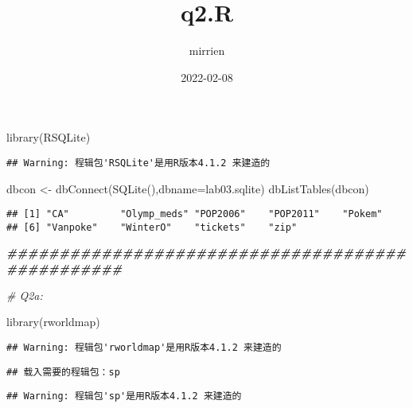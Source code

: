 \documentclass[
]{article}
\title{q2.R}
\author{mirrien}
\date{2022-02-08}
\newenvironment{Shaded}{\begin{snugshade}}{\end{snugshade}}
\newcommand{\AttributeTok}[1]{\textcolor[rgb]{0.77,0.63,0.00}{#1}}
\newcommand{\CommentTok}[1]{\textcolor[rgb]{0.56,0.35,0.01}{\textit{#1}}}
\newcommand{\DocumentationTok}[1]{\textcolor[rgb]{0.56,0.35,0.01}{\textbf{\textit{#1}}}}
\newcommand{\FunctionTok}[1]{\textcolor[rgb]{0.00,0.00,0.00}{#1}}
\newcommand{\NormalTok}[1]{#1}
\newcommand{\OtherTok}[1]{\textcolor[rgb]{0.56,0.35,0.01}{#1}}
\newcommand{\StringTok}[1]{\textcolor[rgb]{0.31,0.60,0.02}{#1}}
\begin{document}
\maketitle

\begin{Shaded}
\begin{Highlighting}[]
\FunctionTok{library}\NormalTok{(RSQLite)}
\end{Highlighting}
\end{Shaded}

\begin{verbatim}
## Warning: 程辑包'RSQLite'是用R版本4.1.2 来建造的
\end{verbatim}

\begin{Shaded}
\begin{Highlighting}[]
\NormalTok{dbcon }\OtherTok{\textless{}{-}} \FunctionTok{dbConnect}\NormalTok{(}\FunctionTok{SQLite}\NormalTok{(),}\AttributeTok{dbname=}\StringTok{\textquotesingle{}lab03.sqlite\textquotesingle{}}\NormalTok{)}
\FunctionTok{dbListTables}\NormalTok{(dbcon)}
\end{Highlighting}
\end{Shaded}

\begin{verbatim}
## [1] "CA"         "Olymp_meds" "POP2006"    "POP2011"    "Pokem"     
## [6] "Vanpoke"    "WinterO"    "tickets"    "zip"
\end{verbatim}

\begin{Shaded}
\begin{Highlighting}[]
\DocumentationTok{\#\#\#\#\#\#\#\#\#\#\#\#\#\#\#\#\#\#\#\#\#\#\#\#\#\#\#\#\#\#\#\#\#\#\#\#\#\#\#\#\#\#\#\#\#\#\#\#\#}

\CommentTok{\# Q2a:}

\FunctionTok{library}\NormalTok{(rworldmap)}
\end{Highlighting}
\end{Shaded}

\begin{verbatim}
## Warning: 程辑包'rworldmap'是用R版本4.1.2 来建造的
\end{verbatim}

\begin{verbatim}
## 载入需要的程辑包：sp
\end{verbatim}

\begin{verbatim}
## Warning: 程辑包'sp'是用R版本4.1.2 来建造的
\end{verbatim}
\end{document}
